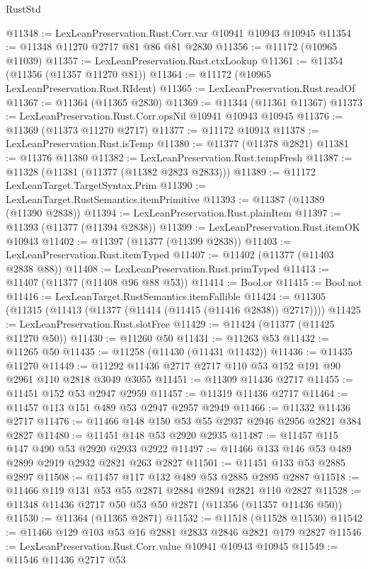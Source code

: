 \begin{lexlean}{RustStd}
\begin{coremodule}
{\begin{coremodule}
{{{{{{{{{{{{{{{{{{{{{{{{{{{{{{{{{@11348 := LexLeanPreservation.Rust.Corr.var @10941 @10943 @10945
@11354 := @11348 @11270 @2717 @81 @86 @81 @2830
@11356 := @11172 (@10965 @11039)
@11357 := LexLeanPreservation.Rust.ctxLookup
@11361 := @11354 (@11356 (@11357 @11270 @81))
@11364 := @11172 (@10965 LexLeanPreservation.Rust.RIdent)
@11365 := LexLeanPreservation.Rust.readOf
@11367 := @11364 (@11365 @2830)
@11369 := @11344 (@11361 @11367)
@11373 := LexLeanPreservation.Rust.Corr.opsNil @10941 @10943 @10945
@11376 := @11369 (@11373 @11270 @2717)
@11377 := @11172 @10913
@11378 := LexLeanPreservation.Rust.isTemp
@11380 := @11377 (@11378 @2821)
@11381 := @11376 @11380
@11382 := LexLeanPreservation.Rust.tempFresh
@11387 := @11328 (@11381 (@11377 (@11382 @2823 @2833)))
@11389 := @11172 LexLeanTarget.TargetSyntax.Prim
@11390 := LexLeanTarget.RustSemantics.itemPrimitive
@11393 := @11387 (@11389 (@11390 @2838))
@11394 := LexLeanPreservation.Rust.plainItem
@11397 := @11393 (@11377 (@11394 @2838))
@11399 := LexLeanPreservation.Rust.itemOK @10943
@11402 := @11397 (@11377 (@11399 @2838))
@11403 := LexLeanPreservation.Rust.itemTyped
@11407 := @11402 (@11377 (@11403 @2838 @88))
@11408 := LexLeanPreservation.Rust.primTyped
@11413 := @11407 (@11377 (@11408 @96 @88 @53))
@11414 := Bool.or
@11415 := Bool.not
@11416 := LexLeanTarget.RustSemantics.itemFallible
@11424 := @11305 (@11315 (@11413 (@11377 (@11414 (@11415 (@11416 @2838)) @2717))))
@11425 := LexLeanPreservation.Rust.slotFree
@11429 := @11424 (@11377 (@11425 @11270 @50))
@11430 := @11260 @50
@11431 := @11263 @53
@11432 := @11265 @50
@11435 := @11258 (@11430 (@11431 @11432))
@11436 := @11435 @11270
@11449 := @11292 @11436 @2717 @2717 @110 @53 @152 @191 @90 @2961 @110 @2818 @3049 @3055
@11451 := @11309 @11436 @2717
@11455 := @11451 @152 @53 @2947 @2959
@11457 := @11319 @11436 @2717
@11464 := @11457 @113 @151 @489 @53 @2947 @2957 @2949
@11466 := @11332 @11436 @2717
@11476 := @11466 @148 @150 @53 @55 @2937 @2946 @2956 @2821 @384 @2827
@11480 := @11451 @148 @53 @2920 @2935
@11487 := @11457 @115 @147 @490 @53 @2920 @2933 @2922
@11497 := @11466 @133 @146 @53 @489 @2899 @2919 @2932 @2821 @263 @2827
@11501 := @11451 @133 @53 @2885 @2897
@11508 := @11457 @117 @132 @489 @53 @2885 @2895 @2887
@11518 := @11466 @119 @131 @53 @55 @2871 @2884 @2894 @2821 @110 @2827
@11528 := @11348 @11436 @2717 @50 @53 @50 @2871 (@11356 (@11357 @11436 @50))
@11530 := @11364 (@11365 @2871)
@11532 := @11518 (@11528 @11530)
@11542 := @11466 @129 @103 @53 @16 @2881 @2833 @2846 @2821 @179 @2827
@11546 := LexLeanPreservation.Rust.Corr.value @10941 @10943 @10945
@11549 := @11546 @11436 @2717 @53
}}}}}}}}}}}}}}}}}}}}}}}}}}}}}}}}}
\end{coremodule}}
\end{coremodule}
\end{lexlean}
